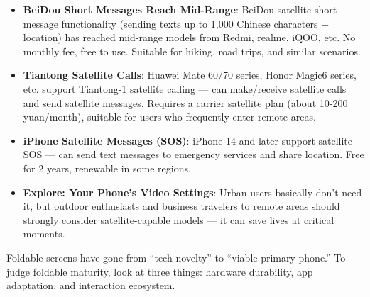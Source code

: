 \begin{itemize}
  \item \textbf{BeiDou Short Messages Reach Mid-Range}: BeiDou satellite short message functionality (sending texts up to 1,000 Chinese characters + location) has reached mid-range models from Redmi, realme, iQOO, etc. No monthly fee, free to use. Suitable for hiking, road trips, and similar scenarios.
  \item \textbf{Tiantong Satellite Calls}: Huawei Mate 60/70 series, Honor Magic6 series, etc. support Tiantong-1 satellite calling — can make/receive satellite calls and send satellite messages. Requires a carrier satellite plan (about 10-200 yuan/month), suitable for users who frequently enter remote areas.
  \item \textbf{iPhone Satellite Messages (SOS)}: iPhone 14 and later support satellite SOS — can send text messages to emergency services and share location. Free for 2 years, renewable in some regions.
  \item \textbf{Explore: Your Phone's Video Settings}: Urban users basically don't need it, but outdoor enthusiasts and business travelers to remote areas should strongly consider satellite-capable models — it can save lives at critical moments.
\end{itemize}


Foldable screens have gone from “tech novelty” to “viable primary phone.” To judge foldable maturity, look at three things: hardware durability, app adaptation, and interaction ecosystem.

